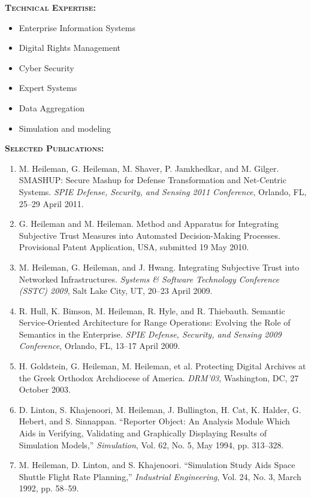\documentclass{sbir}
\begin{document}
\vspace{-18pt}
{\textcolor{black}{\makebox[6.5in]{\hrulefill}}
\textbf{\textsc{Technical Expertise:}}
\vspace{-8pt}
\begin{multicols}{2}
 \begin{itemize}
  \item Enterprise Information Systems
  \item Digital Rights Management
  \item Cyber Security
  \item Expert Systems
  \item Data Aggregation
  \item Simulation and modeling	
 \end{itemize}
\end{multicols}
\vspace{-16pt}
\textbf{\textsc{Selected Publications:}}
\vspace{-8pt}
\begin{enumerate}
\item M. Heileman, G. Heileman, M. Shaver, P. Jamkhedkar, and M. Gilger. SMASHUP: Secure Mashup for Defense Transformation and Net-Centric Systems. {\sl SPIE Defense, Security, and Sensing 2011 Conference}, Orlando, FL, 25--29 April 2011.
\item G. Heileman and M. Heileman. Method and Apparatus for Integrating Subjective Trust Measures into Automated Decision-Making Processes. Provisional Patent Application, USA, submitted 19 May 2010.
\item M. Heileman, G. Heileman, and J. Hwang. Integrating Subjective Trust into Networked Infrastructures. {\sl Systems \& Software Technology Conference (SSTC) 2009}, Salt Lake City, UT, 20--23 April 2009.
\item R. Hull, K. Bimson, M. Heileman, R. Hyle, and R. Thiebauth. Semantic Service-Oriented Architecture for Range Operations: Evolving the Role of Semantics in the Enterprise. {\sl SPIE Defense, Security, and Sensing 2009 Conference}, Orlando, FL, 13--17 April 2009.
\item H. Goldstein, G. Heileman, M. Heileman, et al. Protecting Digital Archives at the Greek Orthodox Archdiocese of America. {\sl DRM'03}, Washington, DC, 27 October 2003.
\item D. Linton, S. Khajenoori, M. Heileman, J. Bullington, H. Cat, K. Halder, G. Hebert, and S. Sinnappan. ``Reporter Object: An Analysis Module Which Aids in Verifying, Validating and Graphically Displaying Results of Simulation Models,'' {\sl Simulation}, Vol. 62, No. 5, May 1994, pp. 313--328.
\item M. Heileman, D. Linton, and S. Khajenoori. ``Simulation Study Aids Space Shuttle Flight Rate Planning,'' {\sl Industrial Engineering}, Vol. 24, No. 3, March 1992, pp. 58--59.
\end{enumerate}

}
\end{document}
